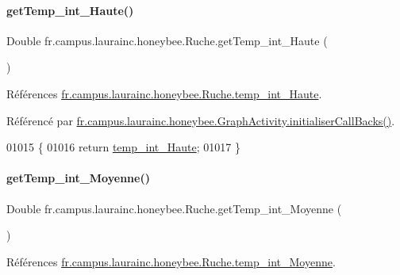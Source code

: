 \paragraph{\texorpdfstring{get\+Temp\+\_\+int\+\_\+\+Haute()}{getTemp\_int\_Haute()}}
{\footnotesize\ttfamily Double fr.\+campus.\+laurainc.\+honeybee.\+Ruche.\+get\+Temp\+\_\+int\+\_\+\+Haute (\begin{DoxyParamCaption}{ }\end{DoxyParamCaption})}



Références \hyperlink{classfr_1_1campus_1_1laurainc_1_1honeybee_1_1_ruche_af50a9a4e5305bd1cd439e5071ed31c9c}{fr.\+campus.\+laurainc.\+honeybee.\+Ruche.\+temp\+\_\+int\+\_\+\+Haute}.



Référencé par \hyperlink{classfr_1_1campus_1_1laurainc_1_1honeybee_1_1_graph_activity_a8dc56c3e0744bcb9295ad10e726b5fdb}{fr.\+campus.\+laurainc.\+honeybee.\+Graph\+Activity.\+initialiser\+Call\+Backs()}.


\begin{DoxyCode}
01015                                       \{
01016         \textcolor{keywordflow}{return} \hyperlink{classfr_1_1campus_1_1laurainc_1_1honeybee_1_1_ruche_af50a9a4e5305bd1cd439e5071ed31c9c}{temp\_int\_Haute};
01017     \}
\end{DoxyCode}
\mbox{\label{classfr_1_1campus_1_1laurainc_1_1honeybee_1_1_ruche_a1524a14620300cf3d3d16d956e7953e5}} 
\paragraph{\texorpdfstring{get\+Temp\+\_\+int\+\_\+\+Moyenne()}{getTemp\_int\_Moyenne()}}
{\footnotesize\ttfamily Double fr.\+campus.\+laurainc.\+honeybee.\+Ruche.\+get\+Temp\+\_\+int\+\_\+\+Moyenne (\begin{DoxyParamCaption}{ }\end{DoxyParamCaption})}



Références \hyperlink{classfr_1_1campus_1_1laurainc_1_1honeybee_1_1_ruche_a99bf4c97fe3710861e0a730cc0010bfb}{fr.\+campus.\+laurainc.\+honeybee.\+Ruche.\+temp\+\_\+int\+\_\+\+Moyenne}.



